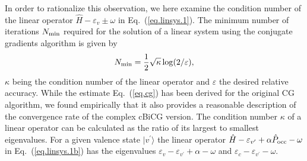 \documentclass[twocolumn,prb,showpacs,superscriptaddress]{revtex4}
\def\w{\omega}
\def\>{\rangle}
\def\<{\langle}
\def\H{\hat{H}}
\def\P{\hat{P}_{\rm occ}}
\def\E{\varepsilon}
\def\vp{{v^\prime}}
\begin{document}
In order to rationalize this observation, we here examine
the condition number of the linear operator $\H-\E_v\pm\w$ in Eq.\ (\ref{eq.linsys.1}).
The minimum number of iterations $N_{\rm min}$ required for the solution of
a linear system using the conjugate gradients algorithm is given by
  \begin{equation}\label{eq.cg}
  N_{\rm min} = \frac{1}{2}\sqrt{\kappa} \log(2/\varepsilon),
  \end{equation}
$\kappa$ being the condition number of the linear operator and $\varepsilon$ the
desired relative accuracy.\cite{painless.cg} 
While the estimate Eq.~(\ref{eq.cg}) has
been derived for the original CG algorithm, we found empirically that it also 
provides a reasonable description of the convergence rate of the complex cBiCG version.
%
The condition number $\kappa$ of a linear operator can be calculated as the ratio 
of its largest to smallest eigenvalues.
For a given valence state 
$|v^\prime\>$ the linear operator $\H - \E_\vp + \alpha \P - \w$ 
in Eq.\ (\ref{eq.linsys.1b}) has the eigenvalues
$\E_v - \E_\vp + \alpha - \w$ and $\E_c - \E_\vp - \w$. 
\end{document}
